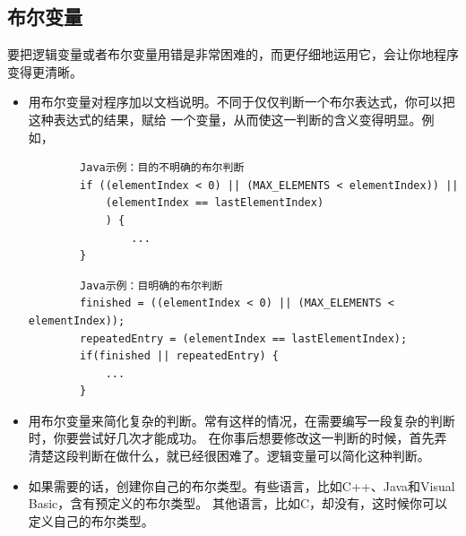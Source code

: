 \documentclass{article}
\begin{document}
\subsection{布尔变量}
要把逻辑变量或者布尔变量用错是非常困难的，而更仔细地运用它，会让你地程序变得更清晰。
\begin{itemize}
    \item 用布尔变量对程序加以文档说明。不同于仅仅判断一个布尔表达式，你可以把这种表达式的结果，赋给
    一个变量，从而使这一判断的含义变得明显。例如，
    \begin{lstlisting}
        Java示例：目的不明确的布尔判断
        if ((elementIndex < 0) || (MAX_ELEMENTS < elementIndex)) ||
            (elementIndex == lastElementIndex)
            ) {
                ...
        }
    \end{lstlisting}
    \begin{lstlisting}
        Java示例：目明确的布尔判断
        finished = ((elementIndex < 0) || (MAX_ELEMENTS < elementIndex));
        repeatedEntry = (elementIndex == lastElementIndex);
        if(finished || repeatedEntry) {
            ...
        }
    \end{lstlisting}
    \item 用布尔变量来简化复杂的判断。常有这样的情况，在需要编写一段复杂的判断时，你要尝试好几次才能成功。
    在你事后想要修改这一判断的时候，首先弄清楚这段判断在做什么，就已经很困难了。逻辑变量可以简化这种判断。
    \item 如果需要的话，创建你自己的布尔类型。有些语言，比如C++、Java和Visual Basic，含有预定义的布尔类型。
    其他语言，比如C，却没有，这时候你可以定义自己的布尔类型。
\end{itemize}
\end{document}
